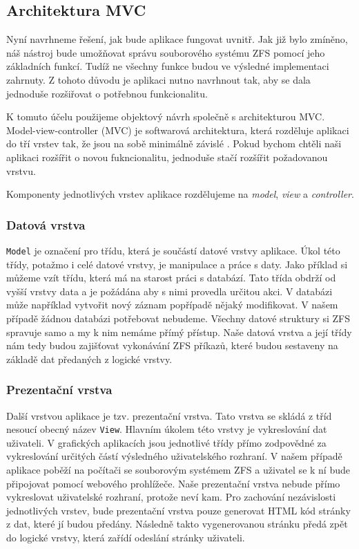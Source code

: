     \subsection{Architektura MVC}
    Nyní navrhneme řešení, jak bude aplikace fungovat uvnitř. Jak již bylo zmíněno, náš nástroj bude umožňovat správu souborového systému ZFS pomocí jeho základních funkcí. Tudíž ne všechny funkce budou ve výsledné implementaci zahrnuty. Z tohoto důvodu je aplikaci nutno navrhnout tak, aby se dala jednoduše rozšiřovat o potřebnou funkcionalitu.

    K tomuto účelu použijeme objektový návrh společně s architekturou MVC. Model-view-controller (MVC) je softwarová architektura, která rozděluje aplikaci do tří vrstev tak, že jsou na sobě minimálně závislé \cite{mvc}. Pokud bychom chtěli naši aplikaci rozšířit o novou fukncionalitu, jednoduše stačí rozšířit požadovanou vrstvu.

    Komponenty jednotlivých vrstev aplikace rozdělujeme na \emph{model}, \emph{view} a \emph{controller}.

        \subsubsection{Datová vrstva}
        \verb|Model| je označení pro třídu, která je součástí datové vrstvy aplikace. Úkol této třídy, potažmo i celé datové vrstvy, je manipulace a práce s daty. Jako příklad si můžeme vzít třídu, která má na starost práci s databází. Tato třída obdrží od vyšší vrstvy data a je požádána aby s nimi provedla určitou akci. V databázi může například vytvořit nový záznam popřípadě nějaký modifikovat. V našem případě žádnou databázi potřebovat nebudeme. Všechny datové struktury si ZFS spravuje samo a my k nim nemáme přímý přístup. Naše datová vrstva a její třídy nám tedy budou zajišťovat vykonávání ZFS příkazů, které budou sestaveny na základě dat předaných z logické vrstvy.
        \subsubsection{Prezentační vrstva}
        Další vrstvou aplikace je tzv. prezentační vrstva. Tato vrstva se skládá z tříd nesoucí obecný název \verb|View|. Hlavním úkolem této vrstvy je vykreslování dat uživateli. V grafických aplikacích jsou jednotlivé třídy přímo zodpovědné za vykreslování určitých částí výsledného uživatelského rozhraní. V našem případě aplikace poběží na počítači se souborovým systémem ZFS a uživatel se k ní bude připojovat pomocí webového prohlížeče. Naše prezentační vrstva nebude přímo vykreslovat uživatelské rozhraní, protože neví kam. Pro zachování nezávislosti jednotlivých vrstev, bude prezentační vrstva pouze generovat HTML kód stránky z dat, které jí budou předány. Následně takto vygenerovanou stránku předá zpět do logické vrstvy, která zařídí odeslání stránky uživateli.
